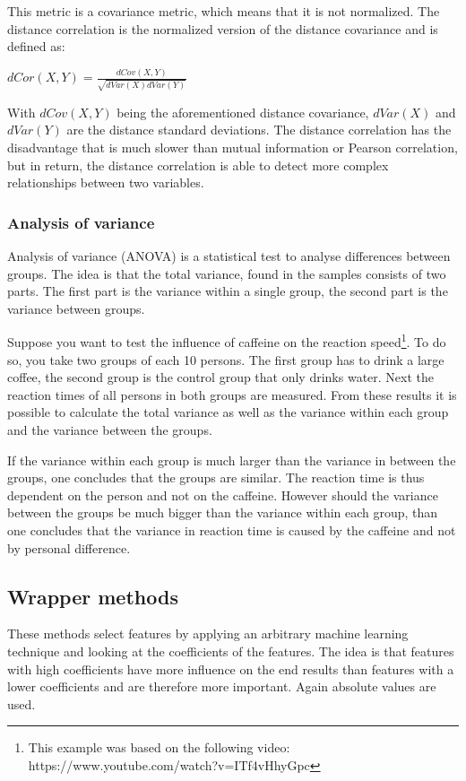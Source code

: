 This metric is a covariance metric, which means that it is not normalized. The distance correlation is the normalized version of the distance covariance and is defined as:

\begin{center}
$dCor(X,Y) = \frac{dCov(X,Y)}{\sqrt{dVar(X)dVar(Y)}}$
\end{center}
With $dCov(X,Y)$ being the aforementioned distance covariance, $dVar(X)$ and $dVar(Y)$ are the distance standard deviations. The distance correlation has the disadvantage that is much slower than mutual information or Pearson correlation, but in return, the distance correlation is able to detect more complex relationships between two variables.

\subsubsection{Analysis of variance}

Analysis of variance (ANOVA) is a statistical test to analyse differences between groups. The idea is that the total variance, found in the samples consists of two parts. The first part is the variance within a single group, the second part is the variance between groups. 

\npar

Suppose you want to test the influence of caffeine on the reaction speed\footnote{This example was based on the following video: https://www.youtube.com/watch?v=ITf4vHhyGpc}. To do so, you take two groups of each 10 persons. The first group has to drink a large coffee, the second group is the control group that only drinks water. Next the reaction times of all persons in both groups are measured. From these results it is possible to calculate the total variance as well as the variance within each group and the variance between the groups. 

\npar

If the variance within each group is much larger than the variance in between the groups, one concludes that the groups are similar. The reaction time is thus dependent on the person and not on the caffeine. However should the variance between the groups be much bigger than the variance within each group, than one concludes that the variance in reaction time is caused by the caffeine and not by personal difference.

\subsection{Wrapper methods}
These methods select features by applying an arbitrary machine learning technique and looking at the coefficients of the features. The idea is that features with high coefficients have more influence on the end results than features with a lower coefficients and are therefore more important. Again absolute values are used.

